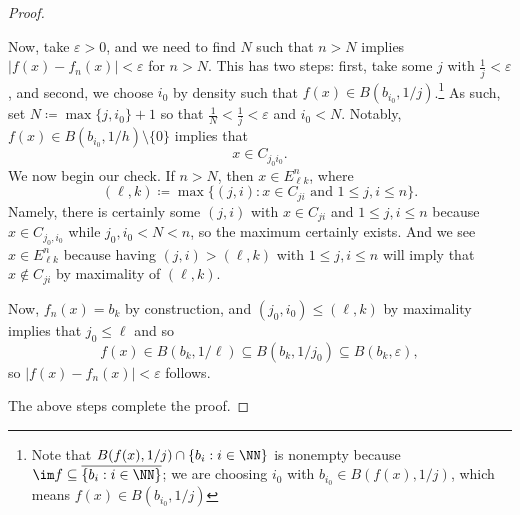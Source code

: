 \documentclass[../notes.tex]{subfiles}
\begin{document}
\begin{proof}
\begin{enumerate}
		Now, take $\varepsilon>0$, and we need to find $N$ such that $n>N$ implies $|f(x)-f_n(x)|<\varepsilon$ for $n>N$. This has two steps: first, take some $j$ with $\frac1j<\varepsilon$, and second, we choose $i_0$ by density such that $f(x)\in B(b_{i_0},1/j)$.\footnote{Note that $B(f(x),1/j)\cap\{b_i:i\in\NN\}$ is nonempty because $\im f\subseteq\overline{\{b_i:i\in\NN\}}$; we are choosing $i_0$ with $b_{i_0}\in B(f(x),1/j)$, which means $f(x)\in B(b_{i_0},1/j)$} As such, set $N\coloneqq\max\{j,i_0\}+1$ so that $\frac1N<\frac1j<\varepsilon$ and $i_0<N$. Notably, $f(x)\in B(b_{i_0},1/h)\setminus\{0\}$ implies that
		\[x\in C_{j_0i_0}.\]
		We now begin our check. If $n>N$, then $x\in E^{n}_{\ell k}$, where
		\[(\ell,k)\coloneqq\max\{(j,i):x\in C_{ji}\text{ and }1\le j,i\le n\}.\]
		Namely, there is certainly some $(j,i)$ with $x\in C_{ji}$ and $1\le j,i\le n$ because $x\in C_{j_0,i_0}$ while $j_0,i_0<N<n$, so the maximum certainly exists. And we see $x\in E^n_{\ell k}$ because having $(j,i)>(\ell,k)$ with $1\le j,i\le n$ will imply that $x\notin C_{ji}$ by maximality of $(\ell,k)$.

		Now, $f_n(x)=b_k$ by construction, and $(j_0,i_0)\le(\ell,k)$ by maximality implies that $j_0\le\ell$ and so
		\[f(x)\in B(b_k,1/\ell)\subseteq B(b_k,1/j_0)\subseteq B(b_k,\varepsilon),\]
		so $|f(x)-f_n(x)|<\varepsilon$ follows.
	\end{enumerate}
	The above steps complete the proof.
\end{proof}
\end{document}
